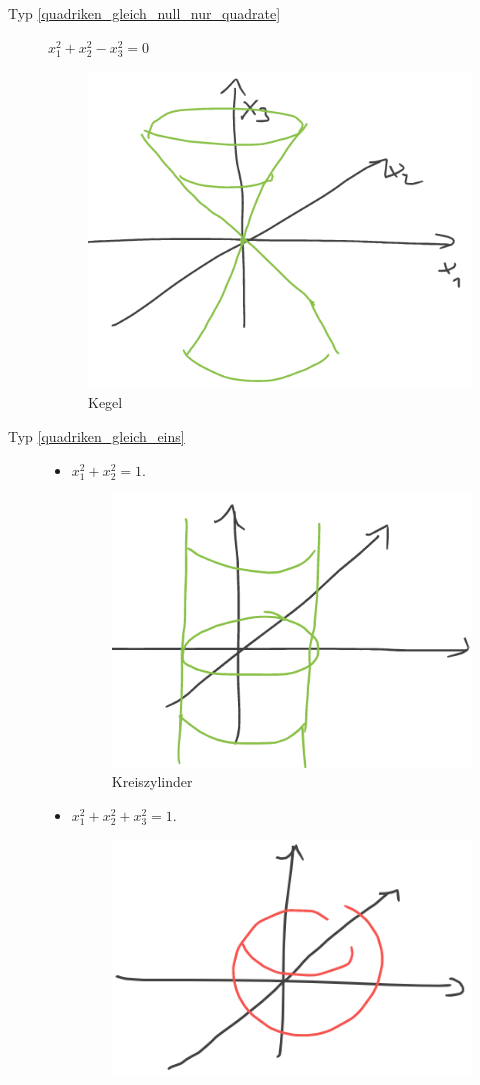 \begin{beispiele*}
  \begin{description}
    \item[Typ \ref{quadriken_gleich_null_nur_quadrate}] \( x_1^2+x_2^2-x_3^2=0 \)
    \begin{figure}[H]
      \centering
      \includegraphics[width=0.5\linewidth]{figures/quadriken_beispiel_kegel}
      \caption*{Kegel}
      \label{fig:quadriken_beispiel_kegel}
    \end{figure}
    \item[Typ \ref{quadriken_gleich_eins}] \begin{itemize}
      \item \( x_1^2+x_2^2=1 \).
      \begin{figure}[H]
        \centering
        \includegraphics[width=0.5\linewidth]{figures/quadriken_beispiel_kreiszylinder}
        \caption*{Kreiszylinder}
        \label{fig:quadriken_beispiel_kreiszylinder}
      \end{figure}
      \item \( x_1^2+x_2^2+x_3^2=1 \).
      \begin{figure}[H]
        \centering
        \includegraphics[width=0.5\linewidth]{figures/quadriken_beispiel_kugel}

\end{figure}
\end{itemize}
\end{description}
\end{beispiele*}
